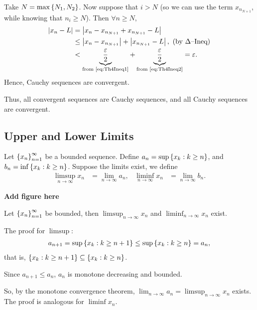 \documentclass[12pt]{article}
\theoremstyle{definition}
\renewenvironment{proof}[1][\proofname]{\vspace{-10pt}\begin{replacementproof}}{\end{replacementproof}}
\newcommand{\xn}{\set{x_{n}}_{n = 1}^{\infty}}
\begin{document}
\begin{proof}
        Take $N = \max\left\{N_{1}, N_{2}\right\}$. Now suppose that $i > N$ (so we can use the term $x_{n_{N + 1}}$, while knowing that $n_{i} \geq N$). 
        Then $\forall n \geq N$,
        \begin{align*}
            \left|x_{n} - L\right| &= \left|x_{n} - x_{n_{N + 1}} + x_{n_{N + 1}} - L\right| \\
                            &\leq \left|x_{n} - x_{n_{N + 1}}\right| + \left|x_{n_{N + 1}} - L\right|, ~ \text{(by $\Delta$--Ineq)} \\
                            &< \underbrace{\frac{\varepsilon}{2}}_{\text{from \eqref{eq:Th4Ineq1}}} + \underbrace{\frac{\varepsilon}{2}}_{\text{from \eqref{eq:Th4Ineq2}}} = \varepsilon.
        \end{align*} 
        Hence, Cauchy sequences are convergent. 

        Thus, all convergent sequences are Cauchy sequences, and all Cauchy sequences are convergent.
    \end{proof}

    \subsection{Upper and Lower Limits}
    \begin{definition}
        Let $\xn$ be a bounded sequence. Define $a_{n} = \sup\left\{x_{k}: k \geq n\right\}$, and $b_{n} = \inf\left\{x_{k}: k \geq n\right\}$. Suppose the limits exist, we define 
        \begin{align*}
            \limsup_{n \rightarrow \infty}x_{n} &= \lim_{n \rightarrow \infty}a_{n}, & \liminf_{n \rightarrow \infty}x_{n} &= \lim_{n \rightarrow \infty}b_{n}.
        \end{align*}
    \end{definition}
    \textbf{Add figure here}
    \begin{prop}
        Let $\xn$ be bounded, then $\limsup_{n \rightarrow \infty}x_{n}$ and $\liminf_{n \rightarrow \infty}x_{n}$ exist. 
    \end{prop}
    \begin{proof}
        The proof for $\limsup$:
        \begin{align*}
            a_{n + 1} = \sup\left\{x_{k}: k \geq n + 1\right\} \leq \sup\left\{x_{k}: k \geq n\right\} = a_{n},
        \end{align*}
        that is, $\left\{x_{k}: k \geq n + 1\right\} \subseteq \left\{x_{k}: k \geq n\right\}$.

        Since $a_{n + 1} \leq a_{n}$, $a_{n}$ is monotone decreasing and bounded. 
        
        So, by the monotone convergence theorem, $\lim_{n \rightarrow \infty}a_{n} = \limsup_{n \rightarrow \infty}x_{n}$ exists. The proof is analogous for $\liminf x_{n}$.
    \end{proof}
\end{document}
